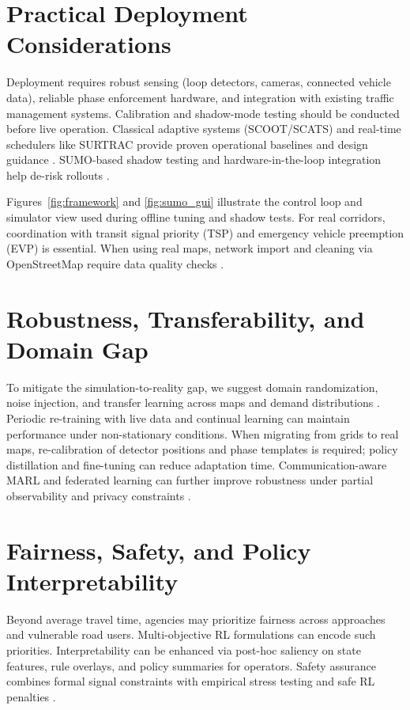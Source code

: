 \documentclass[12pt]{report} %
\begin{document}
\section{Practical Deployment Considerations}

Deployment requires robust sensing (loop detectors, cameras, connected vehicle data), reliable phase enforcement hardware, and integration with existing traffic management systems. Calibration and shadow-mode testing should be conducted before live operation. Classical adaptive systems (SCOOT/SCATS) and real-time schedulers like SURTRAC provide proven operational baselines and design guidance \cite{Robertson_1991,Sims_1980,Smith2013Surtrac}. SUMO-based shadow testing and hardware-in-the-loop integration help de-risk rollouts \cite{Lopez_2018}.

Figures~\ref{fig:framework} and \ref{fig:sumo_gui} illustrate the control loop and simulator view used during offline tuning and shadow tests. For real corridors, coordination with transit signal priority (TSP) and emergency vehicle preemption (EVP) is essential. When using real maps, network import and cleaning via OpenStreetMap require data quality checks \cite{Haklay_2010}.

\section{Robustness, Transferability, and Domain Gap}

To mitigate the simulation-to-reality gap, we suggest domain randomization, noise injection, and transfer learning across maps and demand distributions \cite{M_ller_2023}. Periodic re-training with live data and continual learning can maintain performance under non-stationary conditions. When migrating from grids to real maps, re-calibration of detector positions and phase templates is required; policy distillation and fine-tuning can reduce adaptation time. Communication-aware MARL and federated learning can further improve robustness under partial observability and privacy constraints \cite{Chu_2020,Ye_2021}.

\section{Fairness, Safety, and Policy Interpretability}

Beyond average travel time, agencies may prioritize fairness across approaches and vulnerable road users. Multi-objective RL formulations can encode such priorities. Interpretability can be enhanced via post-hoc saliency on state features, rule overlays, and policy summaries for operators. Safety assurance combines formal signal constraints with empirical stress testing and safe RL penalties \cite{Du_2023}.
\end{document}
